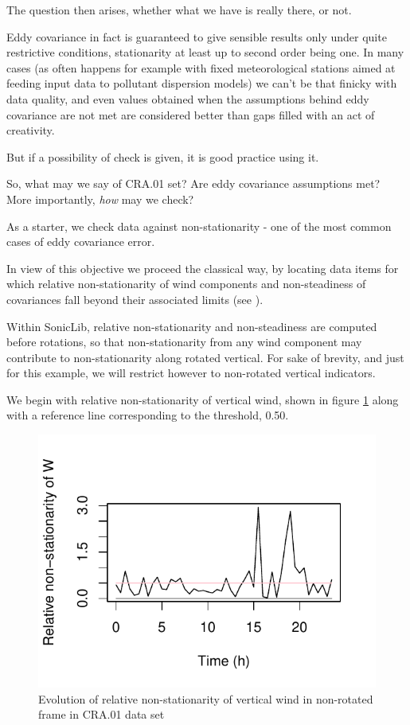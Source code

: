 \documentclass[a4paper,10pt]{book}
\begin{document}
The question then arises, whether what we have is really there, or not.

Eddy covariance in fact is guaranteed to give sensible results only under quite restrictive conditions, stationarity at least up to second order being one. In many cases (as often happens for example with fixed meteorological stations aimed at feeding input data to pollutant dispersion models) we can't be that finicky with data quality, and even values obtained when the assumptions behind eddy covariance are not met are considered better than gaps filled with an act of creativity.

But if a possibility of check is given, it is good practice using it.

So, what may we say of CRA.01 set? Are eddy covariance assumptions met? More importantly, \emph{how} may we check?

As a starter, we check data against non-stationarity - one of the most common cases of eddy covariance error.

In view of this objective we proceed the classical way, by locating data items for which relative non-stationarity of wind components and non-steadiness of covariances fall beyond their associated limits (see \cite{Aubinet2012}).

Within SonicLib, relative non-stationarity and non-steadiness are computed before rotations, so that non-stationarity from any wind component may contribute to non-stationarity along rotated vertical. For sake of brevity, and just for this example, we will restrict however to non-rotated vertical indicators.

We begin with relative non-stationarity of vertical wind, shown in figure \ref{fig:CRA.01 Rel Nonstat W} along with a reference line corresponding to the threshold, 0.50.

\begin{figure}[htp]
 \centering
 \begin{center}
 \includegraphics[scale=1.1,keepaspectratio=true]{./diagrams/CRA01_W_RelNon.pdf}
 \end{center}
 \caption{Evolution of relative non-stationarity of vertical wind in non-rotated frame in CRA.01 data set}
 \label{fig:CRA.01 Rel Nonstat W}
\end{figure}
\end{document}
